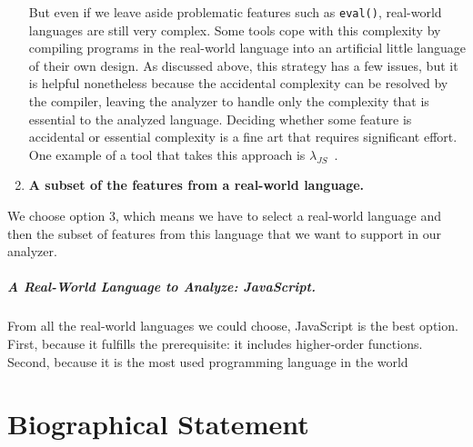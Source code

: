 \documentclass[12pt, oneside]{book}
\begin{document}
\begin{enumerate}
But even if we leave aside problematic features such as \texttt{eval()}, real-world languages are still very complex. Some tools cope with this complexity by compiling programs in the real-world language into an artificial little language of their own design. As discussed above, this strategy has a few issues, but it is helpful nonetheless because the accidental complexity can be resolved by the compiler, leaving the analyzer to handle only the complexity that is essential to the analyzed language. Deciding whether some feature is accidental or essential complexity is a fine art that requires significant effort. One example of a tool that takes this approach is \(\lambda_{\mathit{JS}}\)~\cite{lambda-js}.

\item \textbf{A subset of the features from a real-world language.}
\end{enumerate}

We choose option 3, which means we have to select a real-world language and then the subset of features from this language that we want to support in our analyzer.

\paragraph{A Real-World Language to Analyze: JavaScript.}

From all the real-world languages we could choose, JavaScript is the best option. First, because it fulfills the prerequisite: it includes higher-order functions. Second, because it is the most used programming language in the world~\cite{stack-overflow-developer-survey, jet-brains-developer-survey}

\appendix


\backmatter




\chapter{Biographical Statement}

\end{document}
